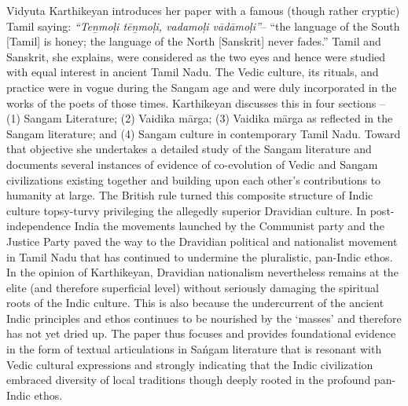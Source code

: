 Vidyuta Karthikeyan introduces her paper with a famous (though rather cryptic) Tamil saying: \textit{“Teṉmoļi tēṉmoļi, vadamoļi vādāmoļi”}– “the language of the South [Tamil] is honey; the language of the North [Sanskrit] never fades.” Tamil and Sanskrit, she explains, were considered as the two eyes and hence were studied with equal interest in ancient Tamil Nadu. The Vedic culture, its rituals, and practice were in vogue during the Sangam age and were duly incorporated in the works of the poets of those times. Karthikeyan discusses this in four sections – (1) Sangam Literature; (2) Vaidika mārga; (3) Vaidika mārga as reflected in the Sangam literature; and (4) Sangam culture in contemporary Tamil Nadu. Toward that objective she undertakes a detailed study of the Sangam literature and documents several instances of evidence of co-evolution of Vedic and Sangam civilizations existing together and building upon each other’s contributions to humanity at large. The British rule turned this composite structure of Indic culture topsy-turvy privileging the allegedly superior Dravidian culture. In post-independence India the movements launched by the Communist party and the Justice Party paved the way to the Dravidian political and nationalist movement in Tamil Nadu that has continued to undermine the pluralistic, pan-Indic ethos. In the opinion of Karthikeyan, Dravidian nationalism nevertheless remains at the elite (and therefore superficial level) without seriously damaging the spiritual roots of the Indic culture. This is also because the undercurrent of the ancient Indic principles and ethos continues to be nourished by the ‘masses’ and therefore has not yet dried up. The paper thus focuses and provides foundational evidence in the form of textual articulations in Sańgam literature that is resonant with Vedic cultural expressions and strongly indicating that the Indic civilization embraced diversity of local traditions though deeply rooted in the profound pan-Indic ethos.

